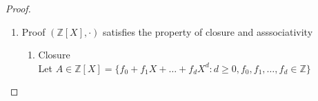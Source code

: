 \documentclass{article}
\theoremstyle{break}
\begin{document}
\begin{enumerate}
\begin{proof}
\begin{enumerate}
\begin{enumerate}
                                Let $B \in \mathbb{Z}[X]  =\{g_0+g_1X+\dots+g_eX^e :e\geq 0, g_0, g_1, \dots , g_e \in \mathbb{Z}\}$\\
                                W.L.O.G, Suppose $e >f$\\
                                $A+B= \{(f_0+g_0)+(f_1+g_1)X+\dots+(f_d+g_d)X^d + \dots +  g_eX^e\} \in \mathbb{Z}[X]$
                                \item Asssociative:\\
                                W.L.O.G, Suppose $f < g < e$\\
                                Let $A \in \mathbb{Z}[X]  =\{f_0+f_1X+\dots+f_dX^d :d\geq 0, f_0, f_1, \dots , f_d \in \mathbb{Z}\}$\\
                                Let $B \in \mathbb{Z}[X]  =\{g_0+g_1X+\dots+g_eX^e :e\geq 0, g_0, g_1, \dots , g_e \in \mathbb{Z}\}$\\
                                Let $C \in \mathbb{Z}[X]  =\{h_0+h_1X+\dots+h_iX^i :i\geq 0, h_0, h_1, \dots , h_i \in \mathbb{Z}\}$\\
                                $(A+B)+C=(f_0+g_0)+(f_1+g_1)X+\dots+(f_d+g_d)X^d + \dots +  g_eX^e + h_0+h_1X+\dots+h_iX^i  = (f_0 + g_0 + h_0) + (f_1+g_1+h_1)X + \dots + (f_d+g_d+h_d)X^d + \dots (g_e + h_e)X^e + \dots h_iX^i$ \\
                                $A+(B+C) = f_0+f_1X+\dots+f_dX^d + ((g_0 + h_0) + (g_1 + h_1)X + \dots + (g_e + h_e)X^e + \dots h_iX^i) = (f_0 + g_0 + h_0) + (f_1+g_1+h_1)X + \dots + (f_d+g_d+h_d)X^d + \dots (g_e + h_e)X^e + \dots h_iX^i$
                                \item Identity: \\
                                $\exists I = \{0 + 0 +\dots + 0\} \in \mathbb{Z}[X], \forall A \in \mathbb{Z}[X], A+I = A$
                                \item Inverse: 
                                $\forall A \in \mathbb{Z}[X] \exists -A \in \mathbb{Z}[X] $, such that $A + (-A) = I$ 
                        \end{enumerate}
                        \item Proof $(\mathbb{Z}[X], ·)$ satisfies the property of closure and asssociativity
                        \begin{enumerate}
                                \item Closure\\
                                Let $A \in \mathbb{Z}[X]  =\{f_0+f_1X+\dots+f_dX^d :d\geq 0, f_0, f_1, \dots , f_d \in \mathbb{Z}\}$\\

\end{enumerate}
\end{enumerate}
\end{proof}
\end{enumerate}
\end{document}
